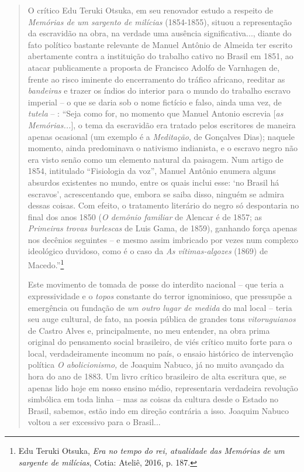 \begin{quote}
O crítico Edu Teruki Otsuka, em seu renovador estudo a respeito de
\emph{Memórias de um sargento de milícias} (1854-1855), situou a
representação da escravidão na obra, na verdade uma ausência
significativa..., diante do fato político bastante relevante de Manuel
Antônio de Almeida ter escrito abertamente contra a instituição do
trabalho cativo no Brasil em 1851, ao atacar publicamente a proposta de
Francisco Adolfo de Varnhagen de, frente ao risco iminente do
encerramento do tráfico africano, reeditar as \emph{bandeiras} e trazer
os índios do interior para o mundo do trabalho escravo imperial -- o que
se daria sob o nome fictício e falso, ainda uma vez, de \emph{tutela} --
: ``Seja como for, no momento que Manuel Antonio escrevia {[}\emph{as
Memórias...}{]}, o tema da escravidão era tratado pelos escritores de
maneira apenas ocasional (um exemplo é a \emph{Meditação}, de Gonçalves
Dias); naquele momento, ainda predominava o nativismo indianista, e o
escravo negro não era visto senão como um elemento natural da paisagem.
Num artigo de 1854, intitulado ``Fisiologia da voz'', Manuel Antônio
enumera alguns absurdos existentes no mundo, entre os quais inclui esse:
`no Brasil há escravos', acrescentando que, embora se saiba disso,
ninguém se admira dessas coisas. Com efeito, o tratamento literário do
negro só despontaria no final dos anos 1850 (\emph{O demônio familiar}
de Alencar é de 1857; as \emph{Primeiras trovas burlescas} de Luis Gama,
de 1859), ganhando força apenas nos decênios seguintes -- e mesmo assim
imbricado por vezes num complexo ideológico duvidoso, como é o caso da
\emph{As vítimas-algozes} (1869) de Macedo.''\footnote{Edu Teruki
  Otsuka, \emph{Era no tempo do rei, atualidade das Memórias de um
  sargente de milícias}, Cotia: Ateliê, 2016, p. 187.}

Este movimento de tomada de posse do interdito nacional -- que teria a
expressividade e o \emph{topos} constante do terror ignominioso, que
pressupõe a emergência ou fundação de \emph{um outro lugar de medida} do
mal local -- teria seu auge cultural, de fato, na poesia pública de
grandes tons \emph{vitoruguianos} de Castro Alves e, principalmente, no
meu entender, na obra prima original do pensamento social brasileiro, de
viés crítico muito forte para o local, verdadeiramente incomum no país,
o ensaio histórico de intervenção política \emph{O abolicionismo,} de
Joaquim Nabuco, já no muito avançado da hora do ano de 1883. Um livro
crítico brasileiro de alta escritura que, se apenas lido hoje em nosso
ensino médio, representaria verdadeira revolução simbólica em toda linha
-- mas as coisas da cultura desde o Estado no Brasil, sabemos, estão
indo em direção contrária a isso. Joaquim Nabuco voltou a ser excessivo
para o Brasil...


\end{quote}
